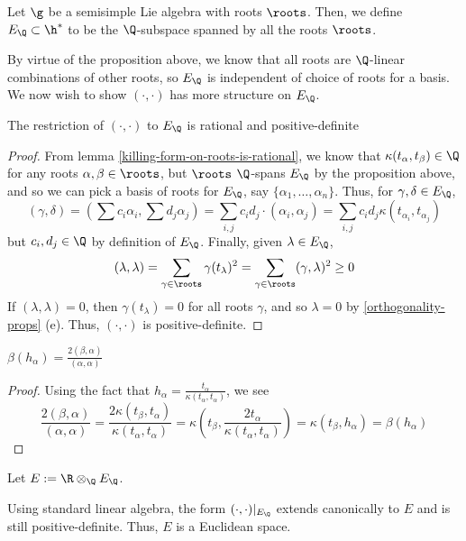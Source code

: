 \documentclass[11pt,leqno,oneside]{amsart}
\numberwithin{thm}{section}
\begin{document}
\begin{defn}
  Let \(\g\) be a semisimple Lie algebra with roots \(\roots\). Then,
  we define \(E_\Q \subset \h^*\) to be the \(\Q\)-subspace spanned by
  all the roots \(\roots\).
\end{defn}
By virtue of the proposition above, we know that all roots are
\(\Q\)-linear combinations of other roots, so \(E_\Q\) is independent
of choice of roots for a basis. We now wish to show \((\cdot, \cdot)\) has
more structure on \(E_\Q\).
\begin{prop}
  The restriction of \((\cdot,\cdot)\) to
  \(E_\Q\) is rational and positive-definite
\end{prop}
\begin{proof}
  From lemma \ref{killing-form-on-roots-is-rational}, we know that
  \(\kappa(t_\alpha, t_\beta) \in \Q\) 
  for any 
  roots \(\alpha,\beta \in \roots\), but \(\roots\) \(\Q\)-spans \(E_\Q\) by
  the proposition above,
  and so we can pick a basis of roots for \(E_\Q\), say \(\{\alpha_1,
  \ldots, \alpha_n\}\). Thus, for \(\gamma, \delta \in E_\Q\), \[
    (\gamma, \delta) = \left( \sum c_i \alpha_i, \sum d_j \alpha_j
    \right) = \sum_{i,j} c_i d_j \cdot (\alpha_i, \alpha_j) = \sum_{i,j} c_i
    d_j \kappa(t_{\alpha_i},t_{\alpha_j})
  \]
  but \(c_i,d_j \in \Q\) by definition of \(E_\Q\). Finally, given
  \(\lambda \in E_\Q\), \[
    (\lambda, \lambda) = \sum_{\gamma \in \roots} \gamma(t_\lambda)^2
    = \sum_{\gamma \in \roots} (\gamma, \lambda)^2 \geq 0
  \]
  If \((\lambda,\lambda) = 0\), then \(\gamma(t_\lambda) = 0\) for all
  roots \(\gamma\), and so \(\lambda = 0\) by
  \ref{orthogonality-props} (e).
  Thus, \((\cdot, \cdot)\) is positive-definite.
\end{proof}
\begin{lem}\label{eval-is-root-sys-refln}
  \(\beta(h_\alpha) = \frac{2(\beta,\alpha)}{(\alpha,\alpha)}\)
\end{lem}
\begin{proof}
  Using the fact that \(h_\alpha =
  \frac{t_\alpha}{\kappa(t_\alpha,t_\alpha)}\), we see \[
    \frac{2(\beta,\alpha)}{(\alpha,\alpha)} =
    \frac{2\kappa(t_\beta,t_\alpha)}{\kappa(t_\alpha,t_\alpha)} =
    \kappa\left( t_\beta, \frac{2t_\alpha}{\kappa(t_\alpha,t_\alpha)}
    \right) = \kappa(t_\beta, h_\alpha) = \beta(h_\alpha)
  \]
\end{proof}
\begin{defn}
  Let \(E := \R \otimes_\Q E_\Q\).
\end{defn}
\begin{rmk}
  Using standard linear algebra, the form \((\cdot,\cdot)|_{E_\Q}\)
  extends canonically to \(E\) and is still positive-definite. Thus,
  \(E\) is a Euclidean space.
\end{rmk}
\end{document}
